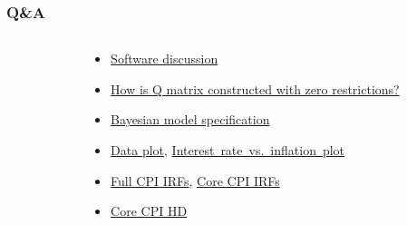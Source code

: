 \documentclass{beamer}
\begin{document}
\begin{frame}
	\frametitle{Q\&A}
	\label{qa}
	\begin{columns}
		\begin{column}{0.49\textwidth}
			\tableofcontents[hideothersubsections]
		\end{column}
		\begin{column}{0.49\textwidth}
			\begin{itemize}
				\item \hyperlink{software}{Software discussion}
				\item \hyperlink{zero_q}{How is Q matrix constructed with zero restrictions?}
				\item \hyperlink{bvar}{Bayesian model specification}
				\item \hyperlink{time_series}{Data plot}, \hyperlink{intrate_cpi}{Interest~rate~vs.~inflation~plot}
				\item \hyperlink{fullirfs}{Full CPI IRFs},  \hyperlink{coreirfs}{Core CPI IRFs}
				\item \hyperlink{corehd}{Core CPI HD}
			\end{itemize}
		\end{column}
	\end{columns}
\end{frame}

\appendix
\end{document}
